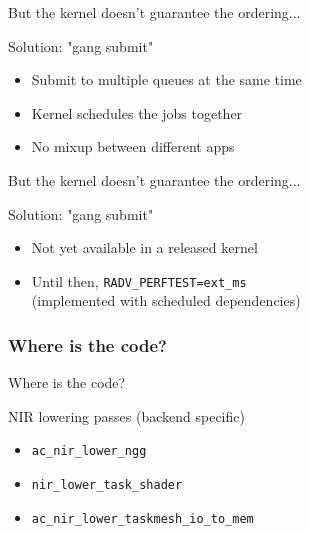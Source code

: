 \documentclass[aspectratio=169,t,xcolor=table]{beamer}
\begin{document}
\begin{frame}{But the kernel doesn't guarantee the ordering...}

    \LARGE

    Solution: "gang submit"
    
    \begin{itemize}
      \item Submit to multiple queues at the same time
      \item Kernel schedules the jobs together
      \item No mixup between different apps
    \end{itemize}

\end{frame}

\begin{frame}{But the kernel doesn't guarantee the ordering...}

    \LARGE

    Solution: "gang submit"
    
    \begin{itemize}
      \item Not yet available in a released kernel
      \item Until then, \texttt{RADV\_PERFTEST=ext\_ms} \\
            (implemented with scheduled dependencies)
    \end{itemize}

\end{frame}

\begin{frame}{}
    \frametitle{Where is the code?}
\end{frame}

\begin{frame}{Where is the code?}

    \LARGE
    NIR lowering passes (backend specific)
    
    \begin{itemize}
      \item \texttt{ac\_nir\_lower\_ngg}
      \item \texttt{nir\_lower\_task\_shader}
      \item \texttt{ac\_nir\_lower\_taskmesh\_io\_to\_mem}
    \end{itemize}

\end{frame}
\end{document}
